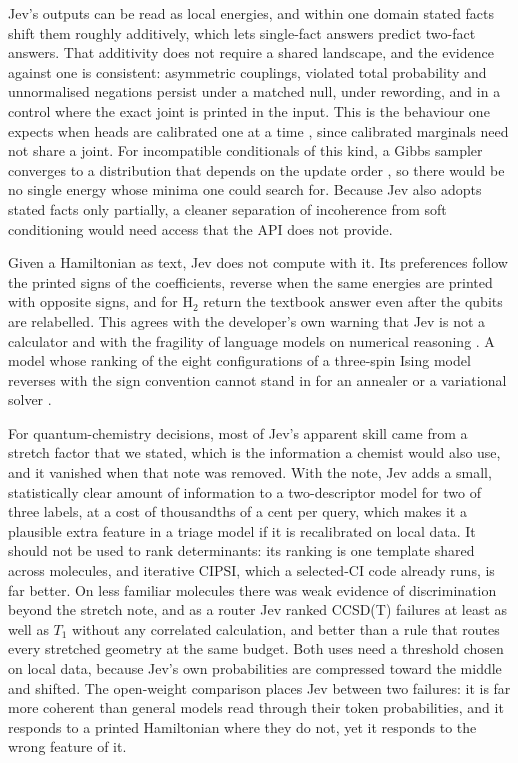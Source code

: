 \documentclass[11pt]{article}
\newcommand{\jev}{Jev}
\begin{document}
\jev{}'s outputs can be read as local energies, and within one domain stated facts shift them roughly additively, which lets single-fact answers predict two-fact answers.
That additivity does not require a shared landscape, and the evidence against one is consistent: asymmetric couplings, violated total probability and unnormalised negations persist under a matched null, under rewording, and in a control where the exact joint is printed in the input.
This is the behaviour one expects when heads are calibrated one at a time \citep{heckerman2000dependency}, since calibrated marginals need not share a joint.
For incompatible conditionals of this kind, a Gibbs sampler converges to a distribution that depends on the update order \citep{heckerman2000dependency}, so there would be no single energy whose minima one could search for.
Because \jev{} also adopts stated facts only partially, a cleaner separation of incoherence from soft conditioning would need access that the API does not provide.

Given a Hamiltonian as text, \jev{} does not compute with it.
Its preferences follow the printed signs of the coefficients, reverse when the same energies are printed with opposite signs, and for H$_2$ return the textbook answer even after the qubits are relabelled.
This agrees with the developer's own warning that \jev{} is not a calculator \citep{typesafe2026jaggedness} and with the fragility of language models on numerical reasoning \citep{mirzadeh2024gsm}.
A model whose ranking of the eight configurations of a three-spin Ising model reverses with the sign convention cannot stand in for an annealer or a variational solver \citep{lucas2014ising,peruzzo2014variational}.

For quantum-chemistry decisions, most of \jev{}'s apparent skill came from a stretch factor that we stated, which is the information a chemist would also use, and it vanished when that note was removed.
With the note, \jev{} adds a small, statistically clear amount of information to a two-descriptor model for two of three labels, at a cost of thousandths of a cent per query, which makes it a plausible extra feature in a triage model if it is recalibrated on local data.
It should not be used to rank determinants: its ranking is one template shared across molecules, and iterative CIPSI, which a selected-CI code already runs, is far better.
On less familiar molecules there was weak evidence of discrimination beyond the stretch note, and as a router \jev{} ranked CCSD(T) failures at least as well as $T_1$ without any correlated calculation, and better than a rule that routes every stretched geometry at the same budget.
Both uses need a threshold chosen on local data, because \jev{}'s own probabilities are compressed toward the middle and shifted.
The open-weight comparison places \jev{} between two failures: it is far more coherent than general models read through their token probabilities, and it responds to a printed Hamiltonian where they do not, yet it responds to the wrong feature of it.
\end{document}
